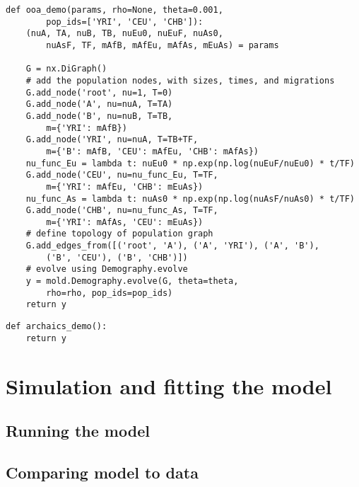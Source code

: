 \documentclass[11pt]{article}
\makeatletter
\newcommand{\py}[1]{\lstinline[breaklines=true,language=Python, showstringspaces=False]@#1@}
\renewcommand{\lstlistingname}{Example Code}
\makeatother
\begin{document}
\begin{lstlisting}[caption={\textbf{Out of Africa Demography graph:} The same model as \lstlistingname~\ref{lst:ooa}, but defined using the Demography module. The Demography method takes advantage of the package \py{networkx}, which we \py{import networkx as nx}. Here, we define populations (nodes) with attributes (such as migration rates and sizes), and then define edges to relate populations.}, float, label={lst:ooa_demo}]
def ooa_demo(params, rho=None, theta=0.001, 
        pop_ids=['YRI', 'CEU', 'CHB']):
    (nuA, TA, nuB, TB, nuEu0, nuEuF, nuAs0, 
        nuAsF, TF, mAfB, mAfEu, mAfAs, mEuAs) = params
    
    G = nx.DiGraph()
    # add the population nodes, with sizes, times, and migrations
    G.add_node('root', nu=1, T=0)
    G.add_node('A', nu=nuA, T=TA)
    G.add_node('B', nu=nuB, T=TB, 
        m={'YRI': mAfB})
    G.add_node('YRI', nu=nuA, T=TB+TF, 
        m={'B': mAfB, 'CEU': mAfEu, 'CHB': mAfAs})
    nu_func_Eu = lambda t: nuEu0 * np.exp(np.log(nuEuF/nuEu0) * t/TF)
    G.add_node('CEU', nu=nu_func_Eu, T=TF, 
        m={'YRI': mAfEu, 'CHB': mEuAs})
    nu_func_As = lambda t: nuAs0 * np.exp(np.log(nuAsF/nuAs0) * t/TF)
    G.add_node('CHB', nu=nu_func_As, T=TF, 
        m={'YRI': mAfAs, 'CEU': mEuAs})
    # define topology of population graph
    G.add_edges_from([('root', 'A'), ('A', 'YRI'), ('A', 'B'),
        ('B', 'CEU'), ('B', 'CHB')])
    # evolve using Demography.evolve
    y = mold.Demography.evolve(G, theta=theta, 
        rho=rho, pop_ids=pop_ids)
    return y
\end{lstlisting}

\begin{lstlisting}[caption={\textbf{Archaic Hominin Demography:}}, float, label={lst:archaic_demo}]
def archaics_demo():
    return y
\end{lstlisting}


\clearpage

\section{Simulation and fitting the model}

\subsection{Running the model}

\subsection{Comparing model to data}
\end{document}

